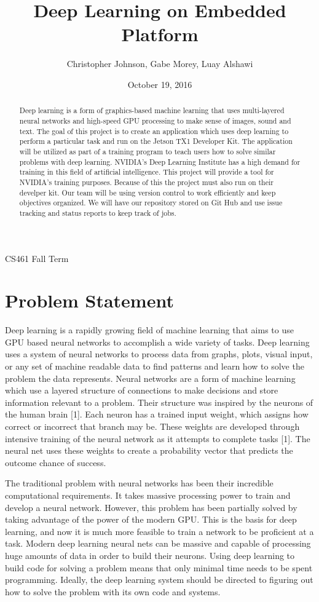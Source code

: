 \documentclass[letterpaper,10pt]{article}
\author{Christopher Johnson, Gabe Morey, Luay Alshawi}
\title{Deep Learning on Embedded Platform}
\date{October 19, 2016}
\begin{document}
\begin{titlingpage}
\maketitle
CS461 Fall Term
\begin{abstract}
Deep learning is a form of graphics-based machine learning that uses multi-layered neural networks and high-speed GPU processing to make sense of images, sound and text. The goal of this project is to create an application which uses deep learning to perform a particular task and run on the Jetson TX1 Developer Kit. The application will be utilized as part of a training program to teach users how to solve similar problems with deep learning. NVIDIA's Deep Learning Institute has a high demand for training in this field of artificial intelligence. This project will provide a tool for NVIDIA's training purposes. Because of this the project must also run on their develper kit. Our team will be using version control to work efficiently and keep objectives organized. We will have our repository stored on Git Hub and use issue tracking and status reports to keep track of jobs.
\end{abstract}
\end{titlingpage}

\section{Problem Statement}

Deep learning is a rapidly growing field of machine learning that aims to use GPU based neural networks to accomplish a wide variety of tasks. Deep learning uses a system of neural networks to process data from graphs, plots, visual input, or any set of machine readable data to find patterns and learn how to solve the problem the data represents. Neural networks are a form of machine learning which use a layered structure of connections to make decisions and store information relevant to a problem. Their structure was inspired by the neurons of the human brain [1]. Each neuron has a trained input weight, which assigns how correct or incorrect that branch may be. These weights are developed through intensive training of the neural network as it attempts to complete tasks [1].  The neural net uses these weights to create a probability vector that predicts the outcome chance of success.
 
The traditional problem with neural networks has been their incredible computational requirements. It takes massive processing power to train and develop a neural network. However, this problem has been partially solved by taking advantage of the power of the modern GPU. This is the basis for deep learning, and now it is much more feasible to train a network to be proficient at a task. Modern deep learning neural nets can be massive and capable of processing huge amounts of data in order to build their neurons. Using deep learning to build code for solving a problem means that only minimal time needs to be spent programming. Ideally, the deep learning system should be directed to figuring out how to solve the problem with its own code and systems.
 
\end{document}
